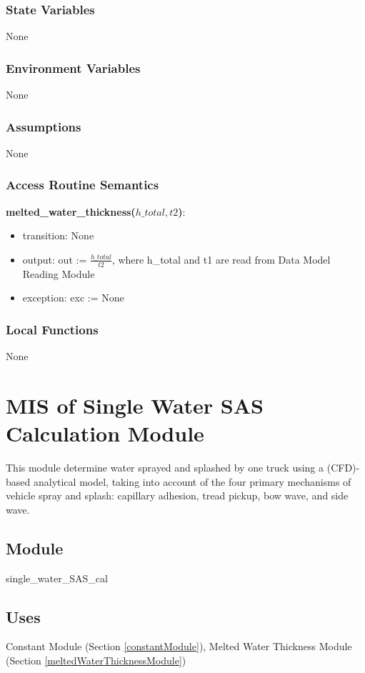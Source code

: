 \documentclass[12pt, titlepage]{article}
\begin{document}
\subsubsection{State Variables}
None
\subsubsection{Environment Variables}
None
\subsubsection{Assumptions}
None
\subsubsection{Access Routine Semantics}

\noindent \textbf{melted\_water\_thickness($h\_total, t2$)}:
\begin{itemize}
\item transition: None
\item output: out := $\frac{h\_total}{t2}$, where h\_total and t1 are read from Data Model Reading Module
\item exception: exc := None
\end{itemize}
\subsubsection{Local Functions}
None
\newpage

\section{MIS of Single Water SAS Calculation Module} \label{singleWaterSASCalculationModule}
This module determine water sprayed and splashed by one truck using a  (CFD)-based analytical model, taking into account of the four primary mechanisms of vehicle spray and splash: capillary adhesion, tread pickup, bow wave, and side wave.

\subsection{Module}
single\_water\_SAS\_cal

\subsection{Uses}

Constant Module (Section \ref{constantModule}), Melted Water Thickness Module (Section \ref{meltedWaterThicknessModule})
\end{document}
